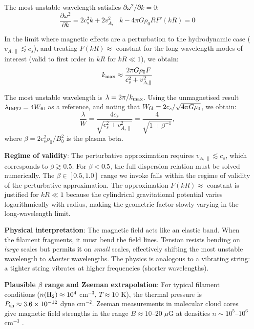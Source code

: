 \documentclass[11pt,a4paper]{article}
\begin{document}
The most unstable wavelength satisfies $\partial \omega^2 / \partial k = 0$:
\begin{equation}
\frac{\partial \omega^2}{\partial k} = 2c_s^2 k + 2v_{A,\parallel}^2 k - 4\pi G \rho_0 R F'(kR) = 0
\end{equation}

In the limit where magnetic effects are a perturbation to the hydrodynamic case ($v_{A,\parallel} \lesssim c_s$), and treating $F(kR) \approx$ constant for the long-wavelength modes of interest (valid to first order in $kR$ for $kR \ll 1$), we obtain:
\begin{equation}
k_{\rm max} \approx \frac{2\pi G \rho_0 F}{c_s^2 + v_{A,\parallel}^2}
\end{equation}

The most unstable wavelength is $\lambda = 2\pi/k_{\rm max}$. Using the unmagnetised result $\lambda_{\rm IM92} = 4W_{\rm fil}$ as a reference, and noting that $W_{\rm fil} = 2c_s/\sqrt{4\pi G\rho_0}$, we obtain:
\begin{equation}
\frac{\lambda}{W} = \frac{4c_s}{\sqrt{c_s^2 + v_{A,\parallel}^2}} = \frac{4}{\sqrt{1 + \beta^{-1}}},
\label{eq:tension_lambda}
\end{equation}
where $\beta = 2c_s^2\rho_0/B_0^2$ is the plasma beta.

\textbf{Regime of validity}: The perturbative approximation requires $v_{A,\parallel} \lesssim c_s$, which corresponds to $\beta \gtrsim 0.5$. For $\beta < 0.5$, the full dispersion relation must be solved numerically. The $\beta \in [0.5, 1.0]$ range we invoke falls within the regime of validity of the perturbative approximation. The approximation $F(kR) \approx$ constant is justified for $kR \ll 1$ because the cylindrical gravitational potential varies logarithmically with radius, making the geometric factor slowly varying in the long-wavelength limit.

\textbf{Physical interpretation}: The magnetic field acts like an elastic band. When the filament fragments, it must bend the field lines. Tension resists bending on \textit{large} scales but permits it on \textit{small} scales, effectively shifting the most unstable wavelength to \textit{shorter} wavelengths. The physics is analogous to a vibrating string: a tighter string vibrates at higher frequencies (shorter wavelengths).

\textbf{Plausible $\beta$ range and Zeeman extrapolation}: For typical filament conditions ($n({\rm H_2}) \approx 10^4$ cm$^{-3}$, $T \approx 10$ K), the thermal pressure is $P_{\rm th} \approx 3.6 \times 10^{-12}$ dyne cm$^{-2}$. Zeeman measurements in molecular cloud cores give magnetic field strengths in the range $B \approx 10$--$20$ $\mu$G at densities $n \sim 10^5$--$10^6$ cm$^{-3}$ \citep{Crutcher2012}.
\end{document}
